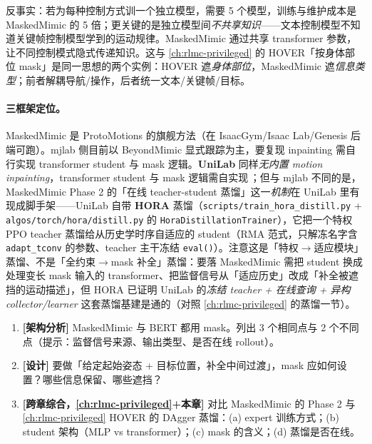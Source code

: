 \begin{insight}\label{ins:rlmc-mm-masked-share}
反事实：若为每种控制方式训一个独立模型，需要 5 个模型，训练与维护成本是 MaskedMimic 的 5 倍；更关键的是独立模型间\emph{不共享知识}——文本控制模型不知道关键帧控制模型学到的运动规律。MaskedMimic 通过共享 transformer 参数，让不同控制模式隐式传递知识。这与 \cref{ch:rlmc-privileged} 的 HOVER「按身体部位 mask」是同一思想的两个实例：HOVER 遮\emph{身体部位}，MaskedMimic 遮\emph{信息类型}；前者解耦导航/操作，后者统一文本/关键帧/目标。
\end{insight}

\paragraph{三框架定位。}MaskedMimic 是 ProtoMotions 的旗舰方法（在 IsaacGym/Isaac Lab/Genesis 后端可跑）。mjlab 侧目前以 BeyondMimic 显式跟踪为主，要复现 inpainting 需自行实现 transformer student 与 mask 逻辑。\textbf{UniLab} 同样\emph{无内置 motion inpainting}，transformer student 与 mask 逻辑需自实现\,\cite{unilab2026}；但与 mjlab 不同的是，MaskedMimic Phase 2 的「在线 teacher-student 蒸馏」这一\emph{机制}在 UniLab 里有现成脚手架——UniLab 自带 \textbf{HORA} 蒸馏（\verb|scripts/train_hora_distill.py| + \verb|algos/torch/hora/distill.py| 的 \verb|HoraDistillationTrainer|），它把一个特权 PPO teacher 蒸馏给从历史学时序自适应的 student（RMA 范式，只解冻名字含 \verb|adapt_tconv| 的参数、teacher 主干冻结 \verb|eval()|）。注意这是「特权$\to$适应模块」蒸馏、不是「全约束$\to$mask 补全」蒸馏：要落 MaskedMimic 需把 student 换成处理变长 mask 输入的 transformer、把监督信号从「适应历史」改成「补全被遮挡的运动描述」，但 HORA 已证明 UniLab 的\emph{冻结 teacher + 在线查询 + 异构 collector/learner} 这套蒸馏基建是通的（对照 \cref{ch:rlmc-privileged} 的蒸馏一节）。

\begin{practice}[练习·MaskedMimic]
\begin{enumerate}
  \item \textbf{[架构分析]} MaskedMimic 与 BERT 都用 mask。列出 3 个相同点与 2 个不同点（提示：监督信号来源、输出类型、是否在线 rollout）。
  \item \textbf{[设计]} 要做「给定起始姿态 + 目标位置，补全中间过渡」，mask 应如何设置？哪些信息保留、哪些遮挡？
  \item \textbf{[跨章综合，\cref{ch:rlmc-privileged}+本章]} 对比 MaskedMimic 的 Phase 2 与 \cref{ch:rlmc-privileged} HOVER 的 DAgger 蒸馏：(a) expert 训练方式；(b) student 架构（MLP vs transformer）；(c) mask 的含义；(d) 蒸馏是否在线。
\end{enumerate}
\end{practice}

